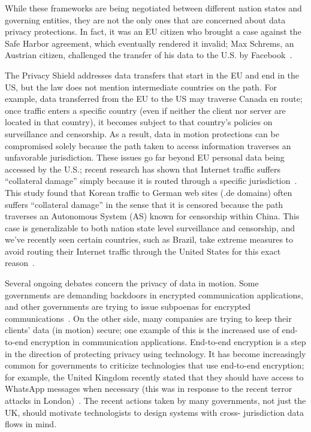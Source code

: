 While these frameworks are being negotiated between different nation states
and governing entities, they are not the only ones that are concerned about
data privacy protections.  In fact, it was an EU citizen who brought a case
against the Safe Harbor agreement, which eventually rendered it invalid; Max
Schrems, an Austrian citizen, challenged the transfer of his data to the U.S.
by Facebook~\cite{schrems}.

The Privacy Shield addresses data transfers that start in the EU and end in
the US, but the law does not mention intermediate countries on the path.  For
example, data transferred from the EU to the US may traverse Canada en route;
once traffic enters a specific country (even if neither the client nor server
are located in that country), it becomes subject to that country's policies on
surveillance and censorship.  As a result, data in motion protections can be
compromised solely because the path taken to access information traverses an
unfavorable jurisdiction.    These issues go far beyond EU personal data being
accessed by the U.S.; recent research has shown that Internet traffic suffers
``collateral damage'' simply because it is routed through a specific
jurisdiction~\cite{levis2012collateral}.  This study found that Korean traffic
to German web sites (.de domains) often suffers ``collateral damage'' in the
sense that it is censored because the path traverses an Autonomous System (AS)
known for censorship within China.  This case is generalizable to both nation
state level surveillance and censorship, and we've recently seen certain
countries, such as Brazil, take extreme measures to avoid routing their
Internet traffic through the United States for this exact
reason~\cite{brazil}.

Several ongoing debates concern the privacy of data in motion.  Some
governments are demanding backdoors in encrypted communication applications,
and other governments are trying to issue subpoenas for encrypted
communications~\cite{whatsapp_uk,signal_fbi}.  On the other side, many
companies are trying to keep their clients' data (in motion) secure; one
example of this is the increased use of end-to-end encryption in communication
applications.  End-to-end encryption is a step in the direction of protecting
privacy using technology.  It has become increasingly common for governments
to criticize technologies that use end-to-end encryption; for example, the
United Kingdom recently stated that they should have access to WhatsApp
messages when necessary (this was in response to the recent terror attacks in
London)~\cite{uk_whatsapp}.  The recent actions taken by many governments, not
just the UK, should motivate technologists to design systems with cross-
jurisdiction data flows in mind.

